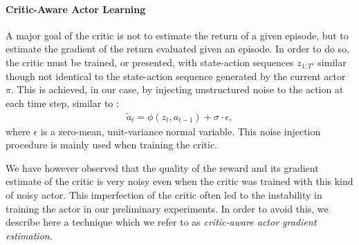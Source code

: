 

\paragraph{Critic-Aware Actor Learning}
A major goal of the critic is not to estimate the return of a given episode, but to estimate the gradient of the return evaluated given an episode. In order to do so, the critic must be trained, or presented, with state-action sequences $z_{1:T'}$ similar though not identical to the state-action sequence generated by the current actor $\pi$. This is achieved, in our case, by injecting unstructured noise to the action at each time step, similar to \citep{heess2015learning}:
\begin{align}
\label{eq:noisy_actor}
\tilde{a}_t = \phi(z_t, a_{t-1}) + \sigma \cdot \epsilon,
\end{align}
where $\epsilon$ is a zero-mean, unit-variance normal variable. This noise injection procedure is mainly used when training the critic. 

We have however observed that the quality of the reward and its gradient estimate of the critic is very noisy even when the critic was trained with this kind of noisy actor. This imperfection of the critic often led to the instability in training the actor in our preliminary experiments. In order to avoid this, we describe here a technique which we refer to as {\it critic-aware actor gradient estimation}.

